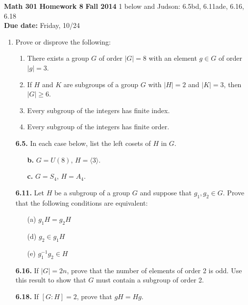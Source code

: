 \documentclass[12pt,reqno]{amsart}
\begin{document}
\thispagestyle{empty}

\noindent \textbf{Math 301} \hskip5cm {\bf Homework 8} \hfill {\bf Fall 2014}
\vskip1cm
 1 below and Judson: 6.5bd, 6.11ade, 6.16, 6.18\\
{\bf Due date:} Friday, 10/24

\bigskip

\begin{enumerate}[{\bf 1.}]

\item
Prove or disprove the following: 
\begin{enumerate}
\item 
There exists a group $G$ of order $|G| = 8$ with an element
$g \in G$ of order $|g|=3$.

\item
If $H$ and $K$ are subgroups of a group $G$ with $|H|=2$ and $|K|=3$, 
  then $|G|\geq 6$.

\item
Every subgroup of the integers has finite index.

\item 
Every subgroup of the integers has finite order.
\end{enumerate}

\newpage

\item[{\bf 6.5.}]
In each case below, list the left cosets of $H$ in $G$.
\begin{enumerate}
\item[{\bf b.}]
$G = U(8)$, $H = \langle 3 \rangle$.
\item[{\bf c.}]
$G = S_4$, $H = A_4$.
\end{enumerate}

\vskip10cm

\item[{\bf 6.11.}] 
Let $H$ be a subgroup of a group $G$ and suppose that $g_1, g_2 \in G$.  Prove
that the following conditions are equivalent: 
\begin{enumerate}
 
\item[(a)]
$g_1 H = g_2 H$
 
\item[(d)]
$g_2 \in g_1 H$
 
\item[(e)]
$g_1^{-1} g_2 \in H$
\end{enumerate}

\newpage
 
\item[{\bf 6.16.}] 
If $|G| = 2n$, prove that the number of elements of order 2 is odd.  Use this
result to show that $G$ must contain a subgroup of order 2. 

\vskip12cm

\item[{\bf 6.18.}] 
If $[G : H] = 2$, prove that $gH = Hg$.

\end{enumerate}
\end{document}

